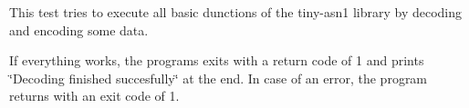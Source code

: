 This test tries to execute all basic dunctions of the tiny-\/asn1 library by decoding and encoding some data.

If everything works, the programs exits with a return code of 1 and prints \char`\"{}\+Decoding finished succesfully\char`\"{} at the end. In case of an error, the program returns with an exit code of 1. 